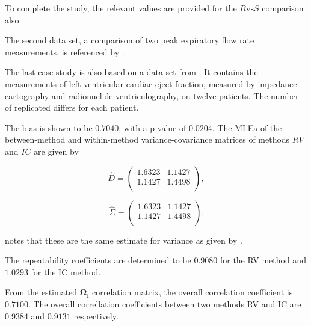 \documentclass[12pt, a4paper]{report}
\theoremstyle{plain}
\theoremstyle{definition}
\theoremstyle{remark}
\begin{document}
	
	
	To complete the study, the relevant values are provided for the $R \mbox{vs} S$ comparison also.
	
	
	The second data set, a comparison of two peak expiratory flow rate measurements, is referenced by \citet{BA86}.
	
	
	The last case study is also based on a data set from  \citet{BA99}. It contains the measurements of left ventricular cardiac eject fraction, measured by impedance cartography and radionuclide ventriculography, on twelve patients.
	The number of replicated differs for each patient.
	
	The bias is shown to be $0.7040$, with a p-value of $0.0204$. The MLEa of the between-method and within-method variance-covariance matrices of methods $RV$ and $IC$ are given by
	
	\begin{equation}\hat{D}=\left(
	\begin{array}{cc}
	1.6323 & 1.1427 \\
	1.1427 & 1.4498 \\
	\end{array}
	\right),
	\end{equation}
	
	
	
	\begin{equation}\hat{\Sigma}=\left(
	\begin{array}{cc}
	1.6323 & 1.1427 \\
	1.1427 & 1.4498 \\
	\end{array}
	\right).
	\end{equation}
	
	\citet{ARoy2009} notes that these are the same estimate for variance as given by \citet{BA99}.
	
	
	The repeatability coefficients are determined to be $0.9080$ for the RV method and $1.0293$ for the IC method.
	
	From the estimated $\boldsymbol{\Omega_{i}}$ correlation matrix, the overall correlation coefficient is $0.7100$.
	The overall correllation coefficients between two methods RV and IC are $0.9384$ and $0.9131$ respectively.
	
\end{document}
